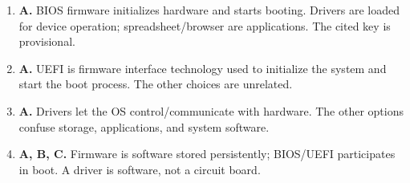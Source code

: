 \begin{enumerate}[label=\textbf{Q\arabic*.}, leftmargin=*]
\item \textbf{A.} BIOS firmware initializes hardware and starts booting. Drivers are loaded for device operation; spreadsheet/browser are applications. The cited key is provisional.

\item \textbf{A.} UEFI is firmware interface technology used to initialize the system and start the boot process. The other choices are unrelated.

\item \textbf{A.} Drivers let the OS control/communicate with hardware. The other options confuse storage, applications, and system software.

\item \textbf{A, B, C.} Firmware is software stored persistently; BIOS/UEFI participates in boot. A driver is software, not a circuit board.

\end{enumerate}
